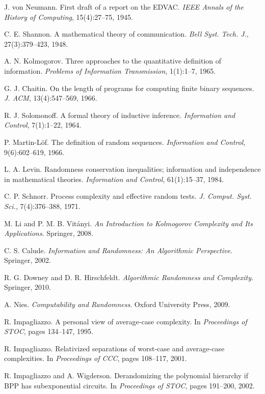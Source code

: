 \documentclass[11pt]{article}
\begin{document}
\begin{thebibliography}{99}
 J. von Neumann. First draft of a report on the EDVAC. \emph{IEEE Annals of the History of Computing}, 15(4):27--75, 1945.

 C. E. Shannon. A mathematical theory of communication. \emph{Bell Syst. Tech. J.}, 27(3):379--423, 1948.

 A. N. Kolmogorov. Three approaches to the quantitative definition of information. \emph{Problems of Information Transmission}, 1(1):1--7, 1965.

 G. J. Chaitin. On the length of programs for computing finite binary sequences. \emph{J. ACM}, 13(4):547--569, 1966.

 R. J. Solomonoff. A formal theory of inductive inference. \emph{Information and Control}, 7(1):1--22, 1964.

 P. Martin-Löf. The definition of random sequences. \emph{Information and Control}, 9(6):602--619, 1966.

 L. A. Levin. Randomness conservation inequalities; information and independence in mathematical theories. \emph{Information and Control}, 61(1):15--37, 1984.

 C. P. Schnorr. Process complexity and effective random tests. \emph{J. Comput. Syst. Sci.}, 7(4):376--388, 1971.

 M. Li and P. M. B. Vitányi. \emph{An Introduction to Kolmogorov Complexity and Its Applications}. Springer, 2008.

 C. S. Calude. \emph{Information and Randomness: An Algorithmic Perspective}. Springer, 2002.

 R. G. Downey and D. R. Hirschfeldt. \emph{Algorithmic Randomness and Complexity}. Springer, 2010.

 A. Nies. \emph{Computability and Randomness}. Oxford University Press, 2009.

 R. Impagliazzo. A personal view of average-case complexity. In \emph{Proceedings of STOC}, pages 134--147, 1995.

 R. Impagliazzo. Relativized separations of worst-case and average-case complexities. In \emph{Proceedings of CCC}, pages 108--117, 2001.

 R. Impagliazzo and A. Wigderson. Derandomizing the polynomial hierarchy if BPP has subexponential circuits. In \emph{Proceedings of STOC}, pages 191--200, 2002.


\end{thebibliography}
\end{document}
